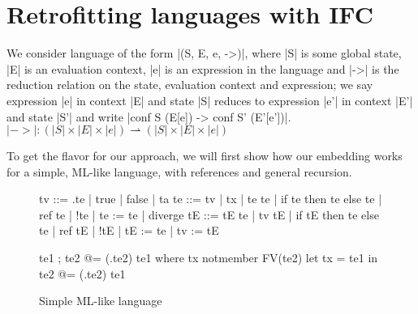 \section{Retrofitting languages with IFC}
\label{sec:retrofit}

We consider language of the form |(S, E, e, ->)|, where |S| is some
global state, |E| is an evaluation context, |e| is an expression in
the language and |->| is the reduction relation on the state,
evaluation context and expression;
we say expression |e| in context |E| and state |S| reduces to
expression |e'| in context |E'| and state |S'| and write
|conf S (E[e]) -> conf S' (E'[e'])|.
$|->| : (|S| \times |E| \times |e|) \rightharpoonup (|S| \times |E| \times |e|)$


To get the flavor for our approach, we will first show how our embedding
works for a simple, ML-like language, with references and general recursion.

\begin{figure}
\begin{code}
tv   ::= \tx.te | true | false | ta
te   ::= tv | tx | te te | if te then te else te | ref te | !te | te := te | diverge
tE   ::= tE te | tv tE | if tE then te else te
       | ref tE | !tE | tE := te | tv := tE 

te1 ; te2            @= (\tx.te2) te1  where  tx notmember FV(te2)
let tx = te1 in te2  @= (\tx.te2) te1
\end{code}


\caption{Simple ML-like language}
\label{fig:ml}
\end{figure}

